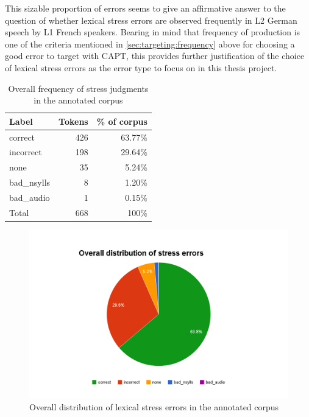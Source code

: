 		
		This sizable proportion of errors seems to give an affirmative answer to the question of whether lexical stress errors are observed frequently in L2 German speech by L1 French speakers. Bearing in mind that frequency of production is one of the criteria mentioned in \cref{sec:targeting:frequency} above for choosing a good error to target with CAPT, this provides further justification of the choice of lexical stress errors as the error type to focus on in this thesis project.
		
		\begin{table}[htb]
			\centering
			\caption{Overall frequency of stress judgments in the annotated corpus}
			\begin{tabular}{lrr}
			\toprule
			Label & Tokens & \% of corpus \\
			\midrule
			correct	& 426	& 63.77\% \\
			incorrect &	198	& 29.64\% \\
			none	 &35 &	5.24\% \\
			bad\_nsylls	& 8	& 1.20\% \\
			bad\_audio	& 1	& 0.15\%\\
			\midrule
			Total & 668 & 100\%\\
			\bottomrule
			\end{tabular}
			\label{tab:results:overall}
		\end{table}
		
		\begin{figure}[ht]
			\centering
			\includegraphics[width=\textwidth]{img/annotation/overallPie}
			\caption{Overall distribution of lexical stress errors in the annotated corpus }
			\label{fig:results:overallpie}
		\end{figure}
		
